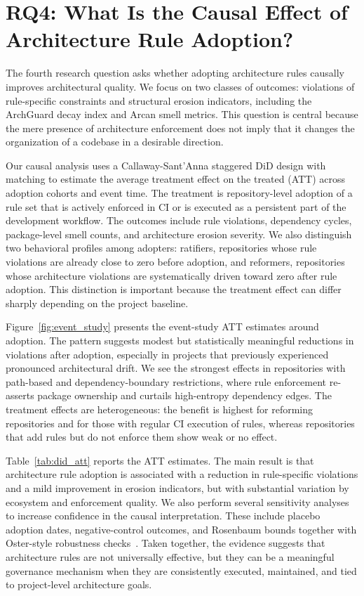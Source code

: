\section{RQ4: What Is the Causal Effect of Architecture Rule Adoption?}\label{sec:rq4}

The fourth research question asks whether adopting architecture rules causally improves architectural quality. We focus on two classes of outcomes: violations of rule-specific constraints and structural erosion indicators, including the ArchGuard decay index and Arcan smell metrics. This question is central because the mere presence of architecture enforcement does not imply that it changes the organization of a codebase in a desirable direction.

Our causal analysis uses a Callaway-Sant'Anna staggered DiD design with matching to estimate the average treatment effect on the treated (ATT) across adoption cohorts and event time. The treatment is repository-level adoption of a rule set that is actively enforced in CI or is executed as a persistent part of the development workflow. The outcomes include rule violations, dependency cycles, package-level smell counts, and architecture erosion severity. We also distinguish two behavioral profiles among adopters: ratifiers, repositories whose rule violations are already close to zero before adoption, and reformers, repositories whose architecture violations are systematically driven toward zero after rule adoption. This distinction is important because the treatment effect can differ sharply depending on the project baseline.

Figure~\ref{fig:event_study} presents the event-study ATT estimates around adoption. The pattern suggests modest but statistically meaningful reductions in violations after adoption, especially in projects that previously experienced pronounced architectural drift. We see the strongest effects in repositories with path-based and dependency-boundary restrictions, where rule enforcement re-asserts package ownership and curtails high-entropy dependency edges. The treatment effects are heterogeneous: the benefit is highest for reforming repositories and for those with regular CI execution of rules, whereas repositories that add rules but do not enforce them show weak or no effect.

Table~\ref{tab:did_att} reports the ATT estimates. The main result is that architecture rule adoption is associated with a reduction in rule-specific violations and a mild improvement in erosion indicators, but with substantial variation by ecosystem and enforcement quality. We also perform several sensitivity analyses to increase confidence in the causal interpretation. These include placebo adoption dates, negative-control outcomes, and Rosenbaum bounds together with Oster-style robustness checks~\cite{rosenbaum2002,oster2019}. Taken together, the evidence suggests that architecture rules are not universally effective, but they can be a meaningful governance mechanism when they are consistently executed, maintained, and tied to project-level architecture goals.




